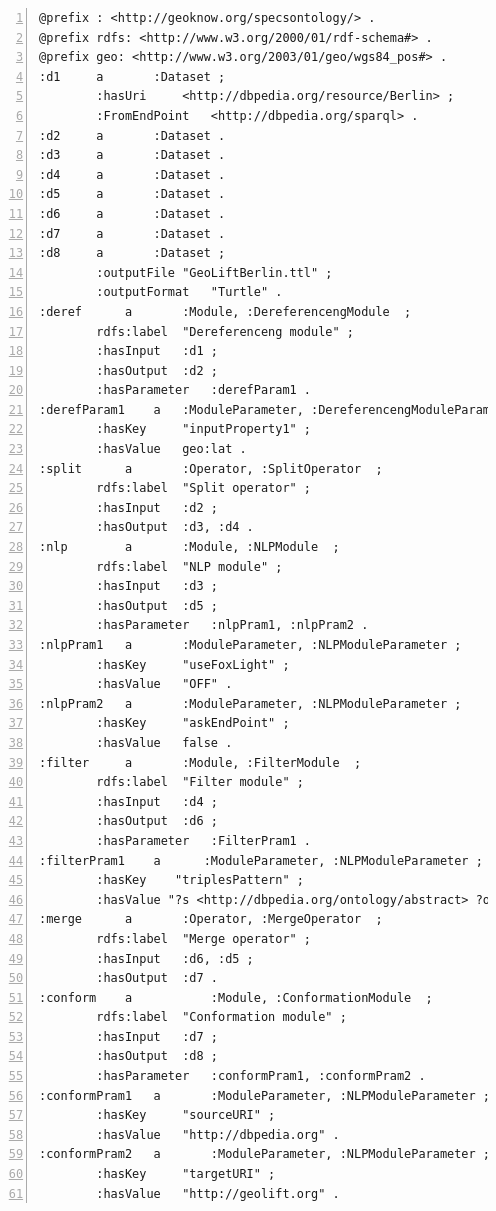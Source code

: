 \documentclass[a4paper,twoside,bibtotoc,abstracton,12pt,BCOR=15mm]{article}
\begin{document}
    
\begin{lstlisting}[label=lst:rdfconf, numbers=left, numberstyle=\tiny, caption = Example of RDF configuration file.]
@prefix : <http://geoknow.org/specsontology/> .
@prefix rdfs: <http://www.w3.org/2000/01/rdf-schema#> .
@prefix geo: <http://www.w3.org/2003/01/geo/wgs84_pos#> .
:d1		a		:Dataset ;
		:hasUri		<http://dbpedia.org/resource/Berlin> ;
		:FromEndPoint	<http://dbpedia.org/sparql> .
:d2		a		:Dataset .
:d3		a		:Dataset .
:d4		a		:Dataset .
:d5		a		:Dataset .
:d6		a		:Dataset .
:d7		a		:Dataset .
:d8		a		:Dataset ;
		:outputFile	"GeoLiftBerlin.ttl" ;
		:outputFormat	"Turtle" .
:deref		a		:Module, :DereferencengModule  ;
		rdfs:label	"Dereferenceng module" ;
		:hasInput	:d1 ;
		:hasOutput	:d2 ;
		:hasParameter	:derefParam1 .
:derefParam1	a   :ModuleParameter, :DereferencengModuleParameter ;
		:hasKey		"inputProperty1" ;
		:hasValue	geo:lat .
:split		a		:Operator, :SplitOperator  ;
		rdfs:label	"Split operator" ;
		:hasInput	:d2 ;
		:hasOutput	:d3, :d4 .
:nlp		a		:Module, :NLPModule  ;
		rdfs:label	"NLP module" ;
		:hasInput	:d3 ;
		:hasOutput	:d5 ;
		:hasParameter	:nlpPram1, :nlpPram2 .
:nlpPram1	a		:ModuleParameter, :NLPModuleParameter ;
		:hasKey		"useFoxLight" ;
		:hasValue	"OFF" .
:nlpPram2 	a		:ModuleParameter, :NLPModuleParameter ;
		:hasKey		"askEndPoint" ;
		:hasValue	false .
:filter		a		:Module, :FilterModule  ;
		rdfs:label	"Filter module" ;
		:hasInput	:d4 ;
		:hasOutput	:d6 ;
		:hasParameter	:FilterPram1 .
:filterPram1	a      :ModuleParameter, :NLPModuleParameter ;
	    :hasKey    "triplesPattern" ;
	    :hasValue "?s <http://dbpedia.org/ontology/abstract> ?o".
:merge		a		:Operator, :MergeOperator  ;
		rdfs:label	"Merge operator" ;
		:hasInput	:d6, :d5 ;
		:hasOutput	:d7 .
:conform	a			:Module, :ConformationModule  ;
		rdfs:label	"Conformation module" ;
		:hasInput	:d7 ;
		:hasOutput	:d8 ;
		:hasParameter	:conformPram1, :conformPram2 .
:conformPram1	a		:ModuleParameter, :NLPModuleParameter ;
		:hasKey		"sourceURI" ;
		:hasValue	"http://dbpedia.org" .
:conformPram2	a		:ModuleParameter, :NLPModuleParameter ;
		:hasKey		"targetURI" ;
		:hasValue	"http://geolift.org" .
\end{lstlisting}
\end{document}
